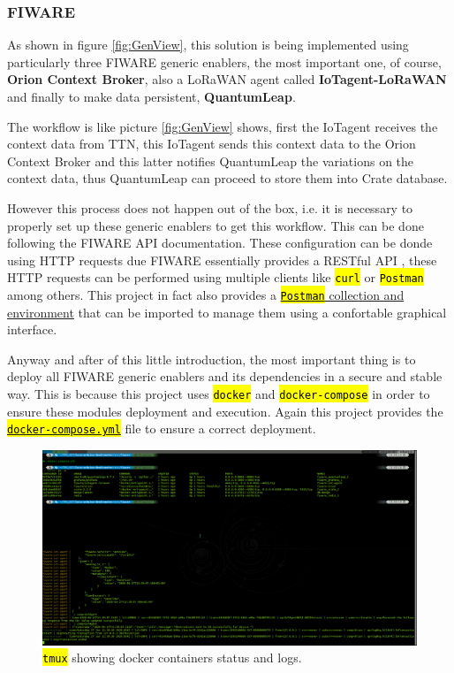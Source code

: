 \documentclass[11pt,a4paper,dvipsnames,twoside]{article}
\newcommand{\cmd}[1] {\hl{\texttt{#1}}}
\begin{document}
\subsubsection{FIWARE}\label{sssec:FIWARE}
As shown in figure \ref{fig:GenView}, this solution is being implemented using particularly three FIWARE generic enablers, the most important one, of course, \textbf{Orion Context Broker}, also a LoRaWAN agent called \textbf{IoTagent-LoRaWAN} and finally to make data persistent, \textbf{QuantumLeap}.

The workflow is like picture \ref{fig:GenView} shows, first the IoTagent receives the context data from TTN, this IoTagent sends this context data to the Orion Context Broker and this latter notifies QuantumLeap the variations on the context data, thus QuantumLeap can proceed to store them into Crate database.

However this process does not happen out of the box, i.e. it is necessary to properly set up these generic enablers to get this workflow. This can be done following the FIWARE API documentation. These configuration can be donde using HTTP requests due FIWARE essentially provides a RESTful API \cite{FIWARE_RESTful}, these HTTP requests can be performed using multiple clients like \cmd{curl} or \cmd{Postman} among others. This project in fact also provides a \href{https://github.com/WyRe/lora-arduino-dendrometer/tree/master/src/postman}{\cmd{Postman} collection and environment} that can be imported to manage them using a confortable graphical interface.

Anyway and after of this little introduction, the most important thing is to deploy all FIWARE generic enablers and its dependencies in a secure and stable way. This is because this project uses \cmd{docker} and \cmd{docker-compose} in order to ensure these modules deployment and execution. Again this project provides the \href{https://github.com/WyRe/lora-arduino-dendrometer/blob/master/src/fiware/docker-compose.yml}{\cmd{docker-compose.yml}} file to ensure a correct deployment. 

\begin{figure}[ht]
  \centering
  \includegraphics[width=.9\textwidth]{../pictures/docker_containers_deployed.png}  
  \caption{\cmd{tmux} showing docker containers status and logs.}
  \label{fig:docker_containers}
\end{figure}
\end{document}
